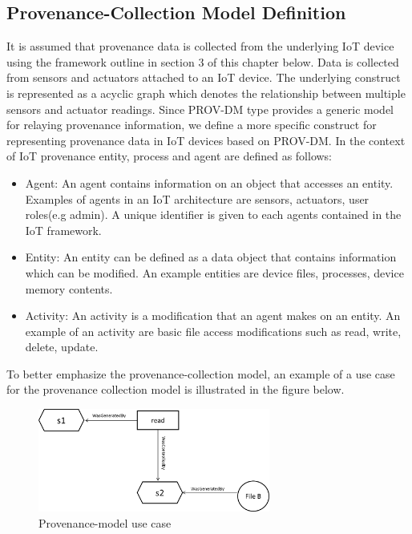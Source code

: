 \subsection{Provenance-Collection Model Definition}

It is assumed that provenance data is collected from the underlying IoT device using the framework outline in section 3 of this chapter below. Data is collected from sensors and actuators attached to an IoT device. The underlying construct is represented as a acyclic graph which denotes the relationship between multiple sensors and actuator readings. Since PROV-DM type provides a generic model for relaying provenance information, we define a more specific construct for representing provenance data in IoT devices based on  PROV-DM. In the context of IoT provenance entity, process and agent are defined as follows:

\begin{itemize}

\item Agent: An agent contains information on an object that accesses an entity. Examples of agents in an IoT architecture are sensors, actuators, user roles(e.g admin). A unique identifier is given to each agents contained in the IoT framework.

\item Entity:  An entity can be defined as a data object that contains information which can be modified. An example entities are device files, processes, device memory contents.

\item Activity: An activity is a modification that an agent makes on an entity. An example of an activity are basic file access modifications such as read, write, delete, update. 


\end{itemize}


To better emphasize the provenance-collection model, an example of a use case for the provenance collection model is illustrated in the figure below.



\begin{figure}[h]
\begin{center}

\includegraphics[width=3.0in]{usecase.png}    
\end{center}
\caption{Provenance-model use case}
\label{autom}
\end{figure}





